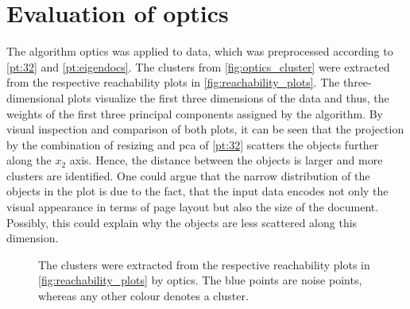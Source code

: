 \section{Evaluation of \acs{optics}}\label{sec:evaluation-OPTICS}
The algorithm \ac{optics} was applied to data, which was preprocessed according to \autoref{pt:32} and \autoref{pt:eigendocs}.
The clusters from \autoref{fig:optics_cluster} were extracted from the respective reachability plots in \autoref{fig:reachability_plots}.
The three-dimensional plots visualize the first three dimensions of the data and thus, the weights of the first three principal components assigned by the \eigendocs{} algorithm.
By visual inspection and comparison of both plots, it can be seen that the projection by the combination of resizing and \ac{pca} of \autoref{pt:32} scatters the objects further along the $x_2$ axis.
Hence, the distance between the objects is larger and more clusters are identified.
One could argue that the narrow distribution of the objects in the \eigendocs{} plot is due to the fact, 
that the input data encodes not only the visual appearance in terms of page layout but also the size of the document.
Possibly, this could explain why the objects are less scattered along this dimension.

\begin{figure}%
    \centering
    \qquad
    \caption[\ac{optics} clusters]{The clusters were extracted from the respective reachability plots in \autoref{fig:reachability_plots} by \ac{optics}.
    The blue points are noise points, whereas any other colour denotes a cluster.}%
    \label{fig:optics_cluster}%
\end{figure}



